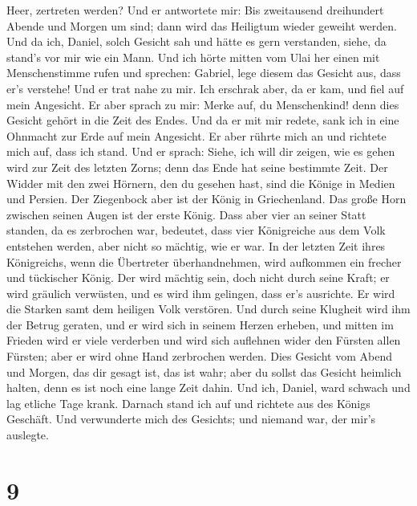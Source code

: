 Heer, zertreten werden?  Und er antwortete mir: Bis
zweitausend dreihundert Abende und Morgen um sind; dann wird das
Heiligtum wieder geweiht werden.  Und da ich, Daniel,
solch Gesicht sah und hätte es gern verstanden, siehe, da stand's vor
mir wie ein Mann.  Und ich hörte mitten vom Ulai her
einen mit Menschenstimme rufen und sprechen: Gabriel, lege diesem das
Gesicht aus, dass er's verstehe!  Und er trat nahe zu
mir. Ich erschrak aber, da er kam, und fiel auf mein Angesicht. Er aber
sprach zu mir: Merke auf, du Menschenkind! denn dies Gesicht gehört in
die Zeit des Endes.  Und da er mit mir redete, sank ich
in eine Ohnmacht zur Erde auf mein Angesicht. Er aber rührte mich an und
richtete mich auf, dass ich stand.  Und er sprach: Siehe,
ich will dir zeigen, wie es gehen wird zur Zeit des letzten Zorns; denn
das Ende hat seine bestimmte Zeit.  Der Widder mit den
zwei Hörnern, den du gesehen hast, sind die Könige in Medien und
Persien.  Der Ziegenbock aber ist der König in
Griechenland. Das große Horn zwischen seinen Augen ist der erste König.
 Dass aber vier an seiner Statt standen, da es zerbrochen
war, bedeutet, dass vier Königreiche aus dem Volk entstehen werden, aber
nicht so mächtig, wie er war.  In der letzten Zeit ihres
Königreichs, wenn die Übertreter überhandnehmen, wird aufkommen ein
frecher und tückischer König.  Der wird mächtig sein,
doch nicht durch seine Kraft; er wird gräulich verwüsten, und es wird
ihm gelingen, dass er's ausrichte. Er wird die Starken samt dem heiligen
Volk verstören.  Und durch seine Klugheit wird ihm der
Betrug geraten, und er wird sich in seinem Herzen erheben, und mitten im
Frieden wird er viele verderben und wird sich auflehnen wider den
Fürsten allen Fürsten; aber er wird ohne Hand zerbrochen werden.
 Dies Gesicht vom Abend und Morgen, das dir gesagt ist,
das ist wahr; aber du sollst das Gesicht heimlich halten, denn es ist
noch eine lange Zeit dahin.  Und ich, Daniel, ward
schwach und lag etliche Tage krank. Darnach stand ich auf und richtete
aus des Königs Geschäft. Und verwunderte mich des Gesichts; und niemand
war, der mir's auslegte.

\hypertarget{section-8}{%
\section{9}\label{section-8}}

